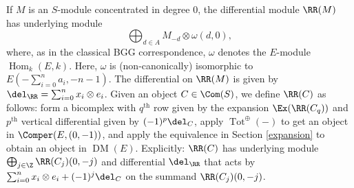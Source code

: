 \documentclass[12pt]{amsart}
\theoremstyle{definition}
\theoremstyle{remark}
\newcommand{\Hom}{\operatorname{Hom}} %
\def\on{\operatorname}
\def\om{\omega}
\def\DM{\operatorname{DM}}
\def\th{\on{th}}
\def\om{\omega}
\begin{document}
If $M$ is an $S$-module concentrated in degree 0, the differential module $\RR(M)$ has underlying module
$$
\bigoplus_{d \in A} M_{-d} \otimes \om(d, 0),
$$
where, as in the classical BGG correspondence, $\om$ denotes the $E$-module $\Hom_k(E, k)$. Here, $\om$ is (non-canonically) isomorphic to $E(-\sum_{i = 0}^n a_i, -n-1)$. The differential on $\RR(M)$ is given by $\del_\RR = \sum_{i = 0}^n x_i \otimes e_i$.
Given an object $C \in \Com(S)$, we define $\RR(C)$ as follows: form a bicomplex with $q^{\th}$ row given by the expansion $\Ex(\RR(C_q))$ and $p^{\th}$ vertical differential given by $(-1)^p\del_C$, apply $\on{Tot}^{\oplus}( - )$ to get an object in $\Comper(E, (0,-1))$, and apply the equivalence in Section \ref{expansion} to obtain an object in $\DM(E)$. Explicitly: $\RR(C)$ has underlying module $\bigoplus_{j \in \Z} \RR(C_j)(0, -j)$ and differential $\del_\RR$ that acts by $ \sum_{i = 0}^n x_i \otimes e_i + (-1)^j\del_C$ on the summand $\RR(C_j)(0, -j)$.

\iffalse
\begin{equation}
\label{bicomplex}
\xymatrix{ 
& \ar[d]^-{\del}   & \ar[d]^-{\del}   & \\
\cdots & \RR(C_q)_p\ar[l]  \ar[d]^-{ \del}     & \RR(C_{q})_{p+1}   \ar[d]^-{ \del}  \ar[l]& \cdots \ar[l]\\
\cdots & \RR(C_{q - 1})_p\ar[d]^-{\del} \ar[l] &  \RR(C_{q -1})_{p+1} \ar[d]^-{\del}  \ar[l]& \ar[l]\cdots \\
&&&
}
\end{equation}
\fi
\end{document}
